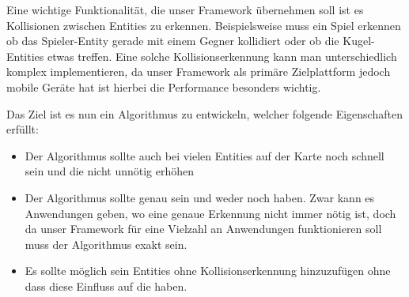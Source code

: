 








Eine wichtige Funktionalität, die unser Framework übernehmen soll ist es Kollisionen zwischen Entities zu erkennen. Beispielsweise muss ein Spiel erkennen ob das Spieler-Entity gerade mit einem Gegner kollidiert oder ob die Kugel-Entities etwas treffen. Eine solche Kollisionserkennung kann man unterschiedlich komplex implementieren, da unser Framework als primäre Zielplattform jedoch mobile Geräte hat ist hierbei die Performance besonders wichtig.

Das Ziel ist es nun ein Algorithmus zu entwickeln, welcher folgende Eigenschaften erfüllt:

\begin{itemize}
\item Der Algorithmus sollte auch bei vielen Entities auf der Karte noch schnell sein und die  nicht unnötig erhöhen
\item Der Algorithmus sollte genau sein und weder  noch  haben. Zwar kann es Anwendungen geben, wo eine genaue Erkennung nicht immer nötig ist, doch da unser Framework für eine Vielzahl an Anwendungen funktionieren soll muss der Algorithmus exakt sein.
\item Es sollte möglich sein Entities ohne Kollisionserkennung hinzuzufügen ohne dass diese Einfluss auf die  haben.
\end{itemize}

